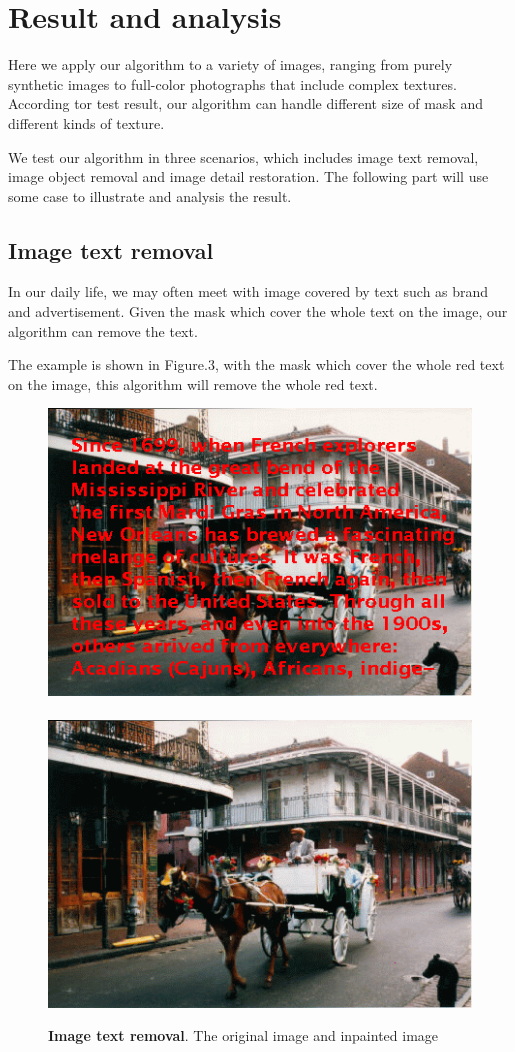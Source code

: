 \section{Result and analysis}
Here we apply our algorithm to a variety of images, ranging from purely synthetic images to full-color photographs that include complex textures. According tor test result, our algorithm can handle different size of mask and different kinds of texture.

We test our algorithm in three scenarios, which includes image text removal, image object removal and image detail restoration. The following part will use some case to illustrate and analysis the result.

\subsection*{Image text removal}
In our daily life, we may often meet with image covered by text such as brand and advertisement. Given the mask which cover the whole text on the image, our algorithm can remove the text.

The example is shown in Figure.3, with the mask which cover the whole red text on the image, this algorithm will remove the whole red text. 
\begin{figure}
	\centering
	\includegraphics[width=0.9\linewidth]{horse_car.png}\\\ \\
	\includegraphics[width=0.9\linewidth]{horse_car_result.png}
	\caption{\textbf{Image text removal}. The original image and inpainted image}
\end{figure}

